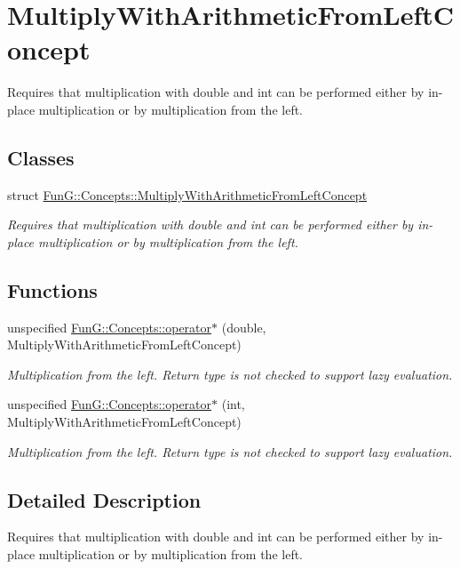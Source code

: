 \hypertarget{group__MultiplyWithArithmeticFromLeftConcept}{\section{Multiply\-With\-Arithmetic\-From\-Left\-Concept}
\label{group__MultiplyWithArithmeticFromLeftConcept}
}


Requires that multiplication with double and int can be performed either by in-\/place multiplication or by multiplication from the left.  


\subsection*{Classes}
\begin{DoxyCompactItemize}
\item 
struct \hyperlink{structFunG_1_1Concepts_1_1MultiplyWithArithmeticFromLeftConcept}{Fun\-G\-::\-Concepts\-::\-Multiply\-With\-Arithmetic\-From\-Left\-Concept}
\begin{DoxyCompactList}\small\item\em Requires that multiplication with double and int can be performed either by in-\/place multiplication or by multiplication from the left. \end{DoxyCompactList}\end{DoxyCompactItemize}
\subsection*{Functions}
\begin{DoxyCompactItemize}
\item 
\hypertarget{group__MultiplyWithArithmeticFromLeftConcept_ga10d0693d96a9ea69e9de1d10b0e4da1f}{unspecified \hyperlink{group__MultiplyWithArithmeticFromLeftConcept_ga10d0693d96a9ea69e9de1d10b0e4da1f}{Fun\-G\-::\-Concepts\-::operator$\ast$} (double, Multiply\-With\-Arithmetic\-From\-Left\-Concept)}\label{group__MultiplyWithArithmeticFromLeftConcept_ga10d0693d96a9ea69e9de1d10b0e4da1f}

\begin{DoxyCompactList}\small\item\em Multiplication from the left. Return type is not checked to support lazy evaluation. \end{DoxyCompactList}\item 
\hypertarget{group__MultiplyWithArithmeticFromLeftConcept_ga593fb8c43bd98b8eae6459f77874c7c7}{unspecified \hyperlink{group__MultiplyWithArithmeticFromLeftConcept_ga593fb8c43bd98b8eae6459f77874c7c7}{Fun\-G\-::\-Concepts\-::operator$\ast$} (int, Multiply\-With\-Arithmetic\-From\-Left\-Concept)}\label{group__MultiplyWithArithmeticFromLeftConcept_ga593fb8c43bd98b8eae6459f77874c7c7}

\begin{DoxyCompactList}\small\item\em Multiplication from the left. Return type is not checked to support lazy evaluation. \end{DoxyCompactList}\end{DoxyCompactItemize}


\subsection{Detailed Description}
Requires that multiplication with double and int can be performed either by in-\/place multiplication or by multiplication from the left. 